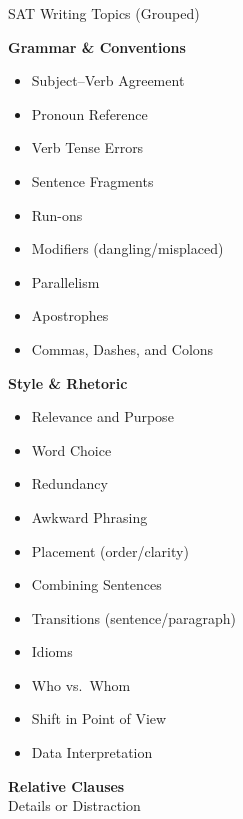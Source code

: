 \documentclass[aspectratio=169,11pt]{beamer}
\begin{document}
\begin{frame}{SAT Writing Topics (Grouped)}
\begin{multicols}{2}
\textbf{Grammar \& Conventions}
\begin{itemize}
  \item Subject–Verb Agreement
  \item Pronoun Reference
  \item Verb Tense Errors
  \item Sentence Fragments
  \item Run-ons
  \item Modifiers (dangling/misplaced)
  \item Parallelism
  \item Apostrophes
  \item Commas, Dashes, and Colons
\end{itemize}

\columnbreak

\textbf{Style \& Rhetoric}
\begin{itemize}
  \item Relevance and Purpose
  \item Word Choice
  \item Redundancy
  \item Awkward Phrasing
  \item Placement (order/clarity)
  \item Combining Sentences
  \item Transitions (sentence/paragraph)
  \item Idioms
  \item Who vs.\ Whom
  \item Shift in Point of View
  \item Data Interpretation
\end{itemize}
\end{multicols}
\end{frame}

\begin{frame}
  \centering
  \Huge \textbf{Relative Clauses} \\[1.5em]
  \Large Details or Distraction
\end{frame}
\end{document}
